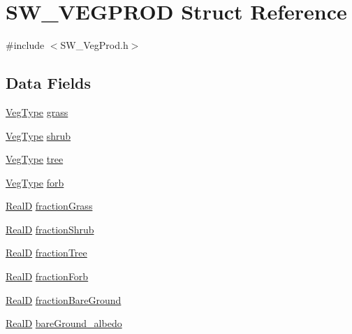 \hypertarget{struct_s_w___v_e_g_p_r_o_d}{}\section{S\+W\+\_\+\+V\+E\+G\+P\+R\+OD Struct Reference}
\label{struct_s_w___v_e_g_p_r_o_d}


{\ttfamily \#include $<$S\+W\+\_\+\+Veg\+Prod.\+h$>$}

\subsection*{Data Fields}
\begin{DoxyCompactItemize}
\item 
\hyperlink{struct_veg_type}{Veg\+Type} \hyperlink{struct_s_w___v_e_g_p_r_o_d_a3d6873adcf58d644b3fbd7ca937d803f}{grass}
\item 
\hyperlink{struct_veg_type}{Veg\+Type} \hyperlink{struct_s_w___v_e_g_p_r_o_d_a6dc02172f3656fc2c1d35be002b44d0a}{shrub}
\item 
\hyperlink{struct_veg_type}{Veg\+Type} \hyperlink{struct_s_w___v_e_g_p_r_o_d_af9b2985ddc2863ecc84e1abb6585ac47}{tree}
\item 
\hyperlink{struct_veg_type}{Veg\+Type} \hyperlink{struct_s_w___v_e_g_p_r_o_d_ab824467c4d0162c7388953956f15345d}{forb}
\item 
\hyperlink{generic_8h_af1c105fd5732f70b91ddaeda0cc340e3}{RealD} \hyperlink{struct_s_w___v_e_g_p_r_o_d_a632540c51146daf5baabc1a403be0b1f}{fraction\+Grass}
\item 
\hyperlink{generic_8h_af1c105fd5732f70b91ddaeda0cc340e3}{RealD} \hyperlink{struct_s_w___v_e_g_p_r_o_d_a50dd7e4e66bb24a38002c69590009af0}{fraction\+Shrub}
\item 
\hyperlink{generic_8h_af1c105fd5732f70b91ddaeda0cc340e3}{RealD} \hyperlink{struct_s_w___v_e_g_p_r_o_d_a42e80f66b6f5973b37090a9e70e9819a}{fraction\+Tree}
\item 
\hyperlink{generic_8h_af1c105fd5732f70b91ddaeda0cc340e3}{RealD} \hyperlink{struct_s_w___v_e_g_p_r_o_d_ae8005e7931a10212d74caffeef6d1731}{fraction\+Forb}
\item 
\hyperlink{generic_8h_af1c105fd5732f70b91ddaeda0cc340e3}{RealD} \hyperlink{struct_s_w___v_e_g_p_r_o_d_a041384568d1586b64687567143cbcd11}{fraction\+Bare\+Ground}
\item 
\hyperlink{generic_8h_af1c105fd5732f70b91ddaeda0cc340e3}{RealD} \hyperlink{struct_s_w___v_e_g_p_r_o_d_ae3b995731fb05eb3b0b8424bf40ddcd2}{bare\+Ground\+\_\+albedo}
\end{DoxyCompactItemize}


